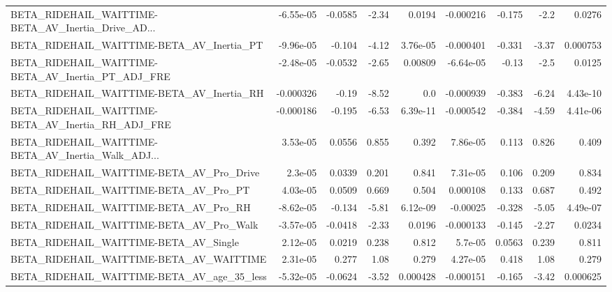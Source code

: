 \begin{tabular}{lrrrrrrrr}
BETA\_RIDEHAIL\_WAITTIME-BETA\_AV\_Inertia\_Drive\_AD... &   -6.55e-05 &      -0.0585 &    -2.34 &   0.0194 &  -0.000216 &      -0.175 &         -2.2 &        0.0276 \\
BETA\_RIDEHAIL\_WAITTIME-BETA\_AV\_Inertia\_PT          &   -9.96e-05 &       -0.104 &    -4.12 & 3.76e-05 &  -0.000401 &      -0.331 &        -3.37 &      0.000753 \\
BETA\_RIDEHAIL\_WAITTIME-BETA\_AV\_Inertia\_PT\_ADJ\_FRE  &   -2.48e-05 &      -0.0532 &    -2.65 &  0.00809 &  -6.64e-05 &       -0.13 &         -2.5 &        0.0125 \\
BETA\_RIDEHAIL\_WAITTIME-BETA\_AV\_Inertia\_RH          &   -0.000326 &        -0.19 &    -8.52 &      0.0 &  -0.000939 &      -0.383 &        -6.24 &      4.43e-10 \\
BETA\_RIDEHAIL\_WAITTIME-BETA\_AV\_Inertia\_RH\_ADJ\_FRE  &   -0.000186 &       -0.195 &    -6.53 & 6.39e-11 &  -0.000542 &      -0.384 &        -4.59 &      4.41e-06 \\
BETA\_RIDEHAIL\_WAITTIME-BETA\_AV\_Inertia\_Walk\_ADJ... &    3.53e-05 &       0.0556 &    0.855 &    0.392 &   7.86e-05 &       0.113 &        0.826 &         0.409 \\
BETA\_RIDEHAIL\_WAITTIME-BETA\_AV\_Pro\_Drive           &     2.3e-05 &       0.0339 &    0.201 &    0.841 &   7.31e-05 &       0.106 &        0.209 &         0.834 \\
BETA\_RIDEHAIL\_WAITTIME-BETA\_AV\_Pro\_PT              &    4.03e-05 &       0.0509 &    0.669 &    0.504 &   0.000108 &       0.133 &        0.687 &         0.492 \\
BETA\_RIDEHAIL\_WAITTIME-BETA\_AV\_Pro\_RH              &   -8.62e-05 &       -0.134 &    -5.81 & 6.12e-09 &   -0.00025 &      -0.328 &        -5.05 &      4.49e-07 \\
BETA\_RIDEHAIL\_WAITTIME-BETA\_AV\_Pro\_Walk            &   -3.57e-05 &      -0.0418 &    -2.33 &   0.0196 &  -0.000133 &      -0.145 &        -2.27 &        0.0234 \\
BETA\_RIDEHAIL\_WAITTIME-BETA\_AV\_Single              &    2.12e-05 &       0.0219 &    0.238 &    0.812 &    5.7e-05 &      0.0563 &        0.239 &         0.811 \\
BETA\_RIDEHAIL\_WAITTIME-BETA\_AV\_WAITTIME            &    2.31e-05 &        0.277 &     1.08 &    0.279 &   4.27e-05 &       0.418 &         1.08 &         0.279 \\
BETA\_RIDEHAIL\_WAITTIME-BETA\_AV\_age\_35\_less         &   -5.32e-05 &      -0.0624 &    -3.52 & 0.000428 &  -0.000151 &      -0.165 &        -3.42 &      0.000625 \\

\end{tabular}
